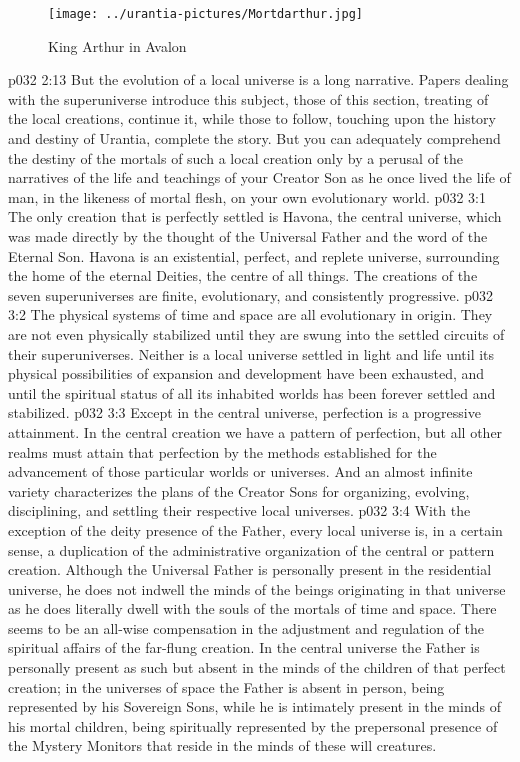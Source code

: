 \begin{figure}[H]
\centering
\texttt{[image: ../urantia-pictures/Mortdarthur.jpg]}
\caption{King Arthur in Avalon}
\end{figure}
\vs p032 2:13 \pc But the evolution of a local universe is a long narrative. Papers dealing with the superuniverse introduce this subject, those of this section, treating of the local creations, continue it, while those to follow, touching upon the history and destiny of Urantia, complete the story. But you can adequately comprehend the destiny of the mortals of such a local creation only by a perusal of the narratives of the life and teachings of your Creator Son as he once lived the life of man, in the likeness of mortal flesh, on your own evolutionary world.
\vs p032 3:1 The only creation that is perfectly settled is Havona, the central universe, which was made directly by the thought of the Universal Father and the word of the Eternal Son. Havona is an existential, perfect, and replete universe, surrounding the home of the eternal Deities, the centre of all things. The creations of the seven superuniverses are finite, evolutionary, and consistently progressive.
\vs p032 3:2 The physical systems of time and space are all evolutionary in origin. They are not even physically stabilized until they are swung into the settled circuits of their superuniverses. Neither is a local universe settled in light and life until its physical possibilities of expansion and development have been exhausted, and until the spiritual status of all its inhabited worlds has been forever settled and stabilized.
\vs p032 3:3 Except in the central universe, perfection is a progressive attainment. In the central creation we have a pattern of perfection, but all other realms must attain that perfection by the methods established for the advancement of those particular worlds or universes. And an almost infinite variety characterizes the plans of the Creator Sons for organizing, evolving, disciplining, and settling their respective local universes.
\vs p032 3:4 \pc With the exception of the deity presence of the Father, every local universe is, in a certain sense, a duplication of the administrative organization of the central or pattern creation. Although the Universal Father is personally present in the residential universe, he does not indwell the minds of the beings originating in that universe as he does literally dwell with the souls of the mortals of time and space. There seems to be an all\hyp{}wise compensation in the adjustment and regulation of the spiritual affairs of the far\hyp{}flung creation. In the central universe the Father is personally present as such but absent in the minds of the children of that perfect creation; in the universes of space the Father is absent in person, being represented by his Sovereign Sons, while he is intimately present in the minds of his mortal children, being spiritually represented by the prepersonal presence of the Mystery Monitors that reside in the minds of these will creatures.
